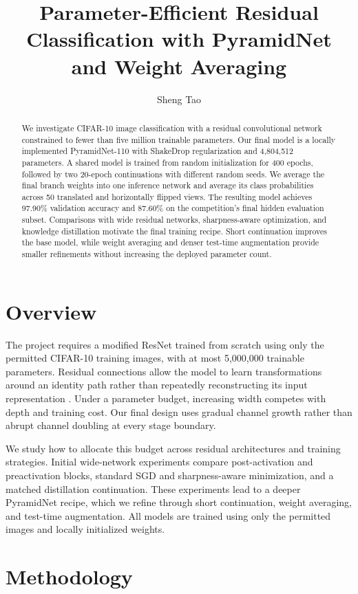 \documentclass[letterpaper]{article}
\title{Parameter-Efficient Residual Classification with PyramidNet and Weight Averaging}
\author{Sheng Tao}
\begin{document}
\maketitle
\begin{abstract}
We investigate CIFAR-10 image classification with a residual convolutional network constrained to fewer than five million trainable parameters. Our final model is a locally implemented PyramidNet-110 with ShakeDrop regularization and 4,804,512 parameters. A shared model is trained from random initialization for 400 epochs, followed by two 20-epoch continuations with different random seeds. We average the final branch weights into one inference network and average its class probabilities across 50 translated and horizontally flipped views. The resulting model achieves 97.90\% validation accuracy and 87.60\% on the competition's final hidden evaluation subset. Comparisons with wide residual networks, sharpness-aware optimization, and knowledge distillation motivate the final training recipe. Short continuation improves the base model, while weight averaging and denser test-time augmentation provide smaller refinements without increasing the deployed parameter count.
\end{abstract}

\section{Overview}
The project requires a modified ResNet trained from scratch using only the permitted CIFAR-10 training images, with at most 5,000,000 trainable parameters. Residual connections allow the model to learn transformations around an identity path rather than repeatedly reconstructing its input representation \citep{he2016resnet}. Under a parameter budget, increasing width competes with depth and training cost. Our final design uses gradual channel growth rather than abrupt channel doubling at every stage boundary.

We study how to allocate this budget across residual architectures and training strategies. Initial wide-network experiments compare post-activation and preactivation blocks, standard SGD and sharpness-aware minimization, and a matched distillation continuation. These experiments lead to a deeper PyramidNet recipe, which we refine through short continuation, weight averaging, and test-time augmentation. All models are trained using only the permitted images and locally initialized weights.

\section{Methodology}
\end{document}
